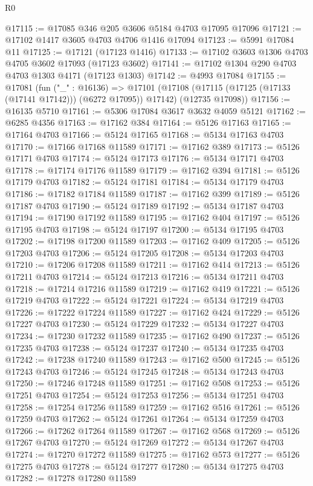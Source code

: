 \begin{lexlean}{R0}
\begin{coremodule}
@17115 := @17085 @346 @205 @3606 @5184 @4703 @17095 @17096
@17121 := @17102 @1417 @3605 @4703 @4706 @1416 @17094
@17123 := @5991 @17084 @11
@17125 := @17121 (@17123 @1416)
@17133 := @17102 @3603 @1306 @4703 @4705 @3602 @17093 (@17123 @3602)
@17141 := @17102 @1304 @290 @4703 @4703 @1303 @4171 (@17123 @1303)
@17142 := @4993 @17084
@17155 := @17081
    (fun ("_" : @16136) =>
    @17101
      (@17108 (@17115 (@17125 (@17133 (@17141 @17142))) (@6272 @17095)) @17142)
      (@12735 @17098))
@17156 := @16135 @5710
@17161 := @5306 @17084 @3617 @3632 @4059 @5121
@17162 := @6285 @4356
@17163 := @17162 @384
@17164 := @5126 @17163
@17165 := @17164 @4703
@17166 := @5124 @17165
@17168 := @5134 @17163 @4703
@17170 := @17166 @17168 @11589
@17171 := @17162 @389
@17173 := @5126 @17171 @4703
@17174 := @5124 @17173
@17176 := @5134 @17171 @4703
@17178 := @17174 @17176 @11589
@17179 := @17162 @394
@17181 := @5126 @17179 @4703
@17182 := @5124 @17181
@17184 := @5134 @17179 @4703
@17186 := @17182 @17184 @11589
@17187 := @17162 @399
@17189 := @5126 @17187 @4703
@17190 := @5124 @17189
@17192 := @5134 @17187 @4703
@17194 := @17190 @17192 @11589
@17195 := @17162 @404
@17197 := @5126 @17195 @4703
@17198 := @5124 @17197
@17200 := @5134 @17195 @4703
@17202 := @17198 @17200 @11589
@17203 := @17162 @409
@17205 := @5126 @17203 @4703
@17206 := @5124 @17205
@17208 := @5134 @17203 @4703
@17210 := @17206 @17208 @11589
@17211 := @17162 @414
@17213 := @5126 @17211 @4703
@17214 := @5124 @17213
@17216 := @5134 @17211 @4703
@17218 := @17214 @17216 @11589
@17219 := @17162 @419
@17221 := @5126 @17219 @4703
@17222 := @5124 @17221
@17224 := @5134 @17219 @4703
@17226 := @17222 @17224 @11589
@17227 := @17162 @424
@17229 := @5126 @17227 @4703
@17230 := @5124 @17229
@17232 := @5134 @17227 @4703
@17234 := @17230 @17232 @11589
@17235 := @17162 @490
@17237 := @5126 @17235 @4703
@17238 := @5124 @17237
@17240 := @5134 @17235 @4703
@17242 := @17238 @17240 @11589
@17243 := @17162 @500
@17245 := @5126 @17243 @4703
@17246 := @5124 @17245
@17248 := @5134 @17243 @4703
@17250 := @17246 @17248 @11589
@17251 := @17162 @508
@17253 := @5126 @17251 @4703
@17254 := @5124 @17253
@17256 := @5134 @17251 @4703
@17258 := @17254 @17256 @11589
@17259 := @17162 @516
@17261 := @5126 @17259 @4703
@17262 := @5124 @17261
@17264 := @5134 @17259 @4703
@17266 := @17262 @17264 @11589
@17267 := @17162 @568
@17269 := @5126 @17267 @4703
@17270 := @5124 @17269
@17272 := @5134 @17267 @4703
@17274 := @17270 @17272 @11589
@17275 := @17162 @573
@17277 := @5126 @17275 @4703
@17278 := @5124 @17277
@17280 := @5134 @17275 @4703
@17282 := @17278 @17280 @11589

\end{coremodule}
\end{lexlean}
